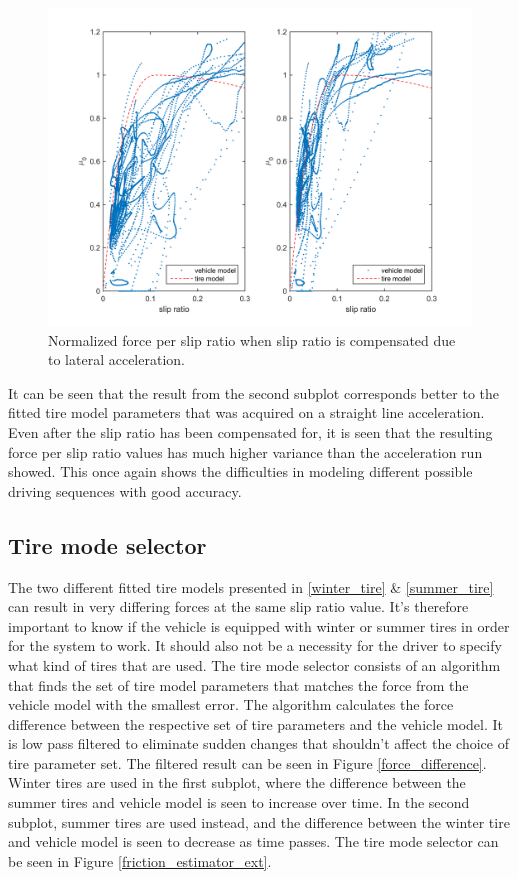 \begin{figure}[h]
	\centering
	\includegraphics[width=1.0\textwidth]{Pictures/latacc_compensated}
	\caption {Normalized force per slip ratio when slip ratio is compensated due to lateral acceleration.}
	\label{latacc_compensated}
\end{figure}

It can be seen that the result from the second subplot corresponds better to the fitted tire model parameters that was acquired on a straight line acceleration. Even after the slip ratio has been compensated for, it is seen that the resulting force per slip ratio values has much higher variance than the acceleration run showed. This once again shows the difficulties in modeling different possible driving sequences with good accuracy. 

\subsection{Tire mode selector}
The two different fitted tire models presented in \ref{winter_tire} \& \ref{summer_tire} can result in very differing forces at the same slip ratio value. It's therefore important to know if the vehicle is equipped with winter or summer tires in order for the system to work. It should also not be a necessity for the driver to specify what kind of tires that are used. The tire mode selector consists  of an algorithm that finds the set of tire model parameters that matches the force from the vehicle model with the smallest error. The algorithm calculates the force difference between the respective set of tire parameters and the vehicle model. It is low pass filtered to eliminate sudden changes that shouldn't affect the choice of tire parameter set. The filtered result can be seen in Figure \ref{force_difference}. Winter tires are used in the first subplot, where the difference between the summer tires and vehicle model is seen to increase over time. In the second subplot, summer tires are used instead, and the difference between the winter tire and vehicle model is seen to decrease as time passes. The tire mode selector can be seen in Figure \ref{friction_estimator_ext}.

